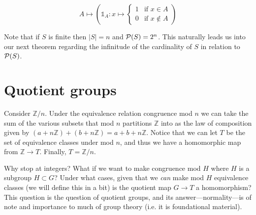 \documentclass{report}
\begin{document}
\[
A \mapsto \left(\mathbb{1}_A : x \mapsto \begin{cases}
  1 & \text{if } x \in A \\
  0 & \text{if } x \not\in A
\end{cases}\right)
\]

Note that if \(S\) is finite then \(|S| = n\) and \(\mathcal{P}(S) = 2^n\). This naturally leads us into our next theorem regarding the infinitude of the cardinality of \(S\) in relation to \(\mathcal{P}(S)\).
\section{Quotient groups}

Consider \(\mathbb{Z} / n\). Under the equivalence relation congruence mod \(n\) we can take the sum of the various subsets that mod \(n\) partitions \(\mathbb{Z}\) into as the law of composition given by \((a + n\mathbb{Z}) + (b + n\mathbb{Z}) = a + b + n\mathbb{Z}\). Notice that we can let \(T\) be the set of equivalence classes under mod \(n\), and thus we have a homomorphic map from \(\mathbb{Z} \to T\). Finally, \(T = \mathbb{Z} / n\).

Why stop at integers? What if we want to make congruence mod \(H\) where \(H\) is a subgroup \(H \subset G\)? Under what cases, given that we \emph{can} make mod \(H\) equivalence classes (we will define this in a bit) is the quotient map \(G \to T\) a homomorphism? This question is the question of quotient groups, and its answer---normality---is of note and importance to much of group theory (i.e. it is foundational material).
\pagebreak
{}
\end{document}
